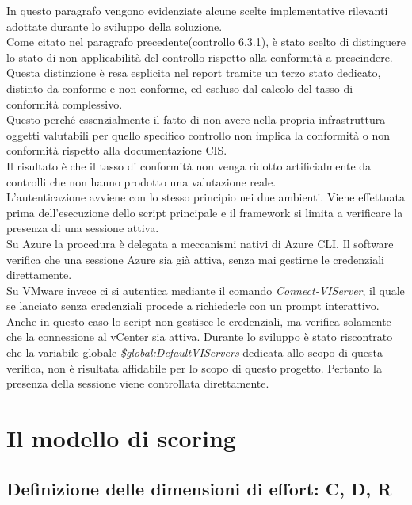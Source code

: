 \documentclass[a4paper,11pt]{report}
\begin{document}
In questo paragrafo vengono evidenziate alcune scelte implementative rilevanti adottate durante lo sviluppo della soluzione. \\
Come citato nel paragrafo precedente(controllo 6.3.1), è stato scelto di distinguere lo stato di non applicabilità del controllo rispetto alla conformità a prescindere. \\
Questa distinzione è resa esplicita nel report tramite un terzo stato dedicato, distinto da conforme e non conforme, ed escluso dal calcolo del tasso di conformità complessivo.\\
Questo perché essenzialmente il fatto di non avere nella propria infrastruttura oggetti valutabili per quello specifico controllo non implica la conformità o non conformità rispetto alla documentazione CIS. \\
Il risultato è che il tasso di conformità non venga ridotto artificialmente da controlli che non hanno prodotto una valutazione reale. \\

L'autenticazione avviene con lo stesso principio nei due ambienti. Viene effettuata prima dell'esecuzione dello script principale e il framework si limita a verificare la presenza di una sessione attiva.\\
Su Azure la procedura è delegata a meccanismi nativi di Azure CLI. Il software verifica che una sessione Azure sia già attiva, senza mai gestirne le credenziali direttamente.\\
Su VMware invece ci si autentica mediante il comando \textit{Connect-VIServer}, il quale se lanciato senza credenziali procede a richiederle con un prompt interattivo. Anche in questo caso lo script non gestisce le credenziali, ma verifica solamente che la connessione al vCenter sia attiva. Durante lo sviluppo è stato riscontrato che la variabile globale \textit{\$global:DefaultVIServers} dedicata allo scopo di questa verifica, non è risultata affidabile per lo scopo di questo progetto. Pertanto la presenza della sessione viene controllata direttamente.


\chapter{Il modello di scoring}

\section{Definizione delle dimensioni di effort: C, D, R}
\end{document}
